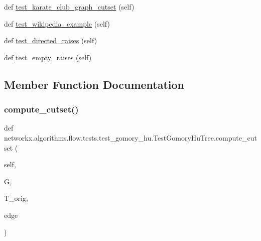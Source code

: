 \begin{DoxyCompactItemize}
def \hyperlink{classnetworkx_1_1algorithms_1_1flow_1_1tests_1_1test__gomory__hu_1_1TestGomoryHuTree_afa5a53b31ac44141b98999cef62a1b1b}{test\+\_\+karate\+\_\+club\+\_\+graph\+\_\+cutset} (self)
\item 
def \hyperlink{classnetworkx_1_1algorithms_1_1flow_1_1tests_1_1test__gomory__hu_1_1TestGomoryHuTree_aa5e20da5f4ef19b9aa140cce4f864fd4}{test\+\_\+wikipedia\+\_\+example} (self)
\item 
def \hyperlink{classnetworkx_1_1algorithms_1_1flow_1_1tests_1_1test__gomory__hu_1_1TestGomoryHuTree_a6a3744cf56535744e613c634b912ba5f}{test\+\_\+directed\+\_\+raises} (self)
\item 
def \hyperlink{classnetworkx_1_1algorithms_1_1flow_1_1tests_1_1test__gomory__hu_1_1TestGomoryHuTree_ab0d87832a5412e104083352fb8b2dff4}{test\+\_\+empty\+\_\+raises} (self)
\end{DoxyCompactItemize}


\subsection{Member Function Documentation}
\mbox{\label{classnetworkx_1_1algorithms_1_1flow_1_1tests_1_1test__gomory__hu_1_1TestGomoryHuTree_a0ac4c3448ef118a511feeb92f3b541ce}} 
\subsubsection{\texorpdfstring{compute\+\_\+cutset()}{compute\_cutset()}}
{\footnotesize\ttfamily def networkx.\+algorithms.\+flow.\+tests.\+test\+\_\+gomory\+\_\+hu.\+Test\+Gomory\+Hu\+Tree.\+compute\+\_\+cutset (\begin{DoxyParamCaption}\item[{}]{self,  }\item[{}]{G,  }\item[{}]{T\+\_\+orig,  }\item[{}]{edge }\end{DoxyParamCaption})}

